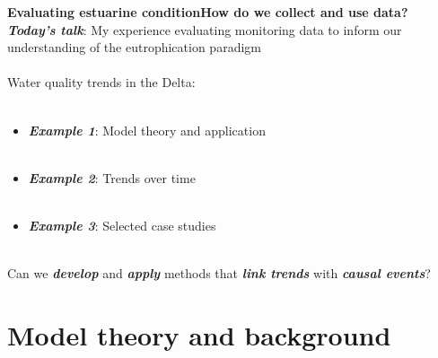 \documentclass[serif]{beamer}\usepackage[]{graphicx}\usepackage[]{color}
\newcommand{\emtxt}[1]{\textbf{\textit{#1}}}
\begin{document}
\begin{frame}{\textbf{Evaluating estuarine condition}}{\textbf{How do we collect and use data?}}
\onslide<+->
\emtxt{Today's talk}: My experience evaluating monitoring data to inform our understanding of the eutrophication paradigm\\~\\
\onslide<+->
Water quality trends in the Delta: \\~\\
\begin{itemize}
\item \emtxt{Example 1}: Model theory and application \\~\\
\item \emtxt{Example 2}: Trends over time \\~\\
\item \emtxt{Example 3}: Selected case studies \\~\\
\end{itemize}
\onslide<+->
Can we \emtxt{develop} and \emtxt{apply} methods that \emtxt{link trends} with \emtxt{causal events}?
\end{frame}

\section{Model theory and background}
\end{document}
